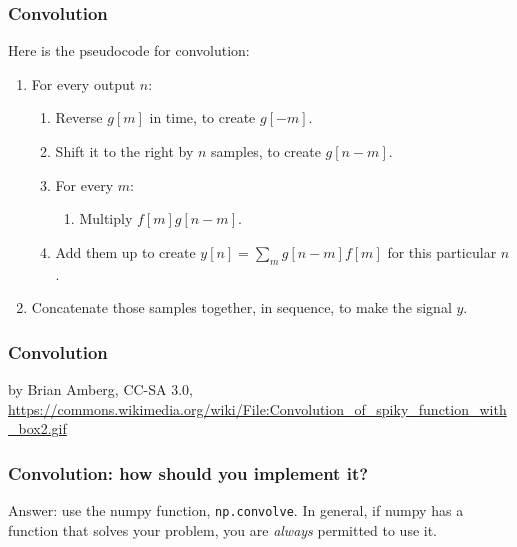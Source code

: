 \documentclass{beamer}
\begin{document}
\begin{frame}
  \frametitle{Convolution}
  \centerline{}

  \vspace*{2mm}
  
  Here is the pseudocode for convolution:
  \begin{enumerate}
  \item For every output $n$:
    \begin{enumerate}
    \item Reverse $g[m]$ in time, to create $g[-m]$.
    \item Shift it to the right by $n$ samples, to create $g[n-m]$.
    \item For every $m$:
      \begin{enumerate}
      \item Multiply $f[m]g[n-m]$.
      \end{enumerate}
    \item Add them up to create $y[n] = \sum_m g[n-m] f[m]$ for this particular $n$.
    \end{enumerate}
    \item Concatenate those samples together, in sequence, to make the signal $y$.
  \end{enumerate}
\end{frame}

\begin{frame}
  \frametitle{Convolution}
  \begin{tiny}
    by Brian Amberg, CC-SA 3.0,
    \url{https://commons.wikimedia.org/wiki/File:Convolution_of_spiky_function_with_box2.gif}
  \end{tiny}
\end{frame}

\begin{frame}
  \frametitle{Convolution: how should you implement it?}
  Answer: use the numpy function, {\tt np.convolve}.  In general, if numpy has a function
  that solves your problem, you are {\em always} permitted to use it.

  \vspace*{2mm}
  
  \centerline{}
\end{frame}
  
\end{document}
